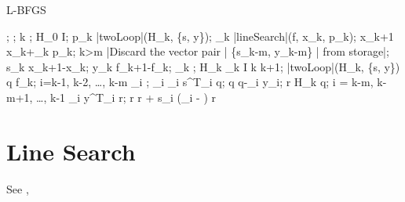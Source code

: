 \begin{algorithm}
    \mbox{L-BFGS}
    \begin{program}
        \BEGIN
        ;
        ;
        k ;
        H_0 \leftarrow I;
        \WHILE \NOT{} \DO
        p_k \leftarrow |twoLoop|(H_k, \{s, y\});
        \alpha_k \leftarrow |lineSearch|(f, x_k, p_k); 
        x_{k+1} \leftarrow x_k+\alpha_k p_k;
        \IF k>m
        \THEN
            |Discard the vector pair | \{s_{k-m}, y_{k-m}\} | from storage|;
        \FI
        s_k \leftarrow x_{k+1}-x_k;
        y_k \leftarrow \nabla f_{k+1}-\nabla f_k;
        \gamma_k \leftarrow {};
        H_k \leftarrow \gamma_k I
        k \leftarrow k+1;
        \OD
        \WHERE
        \FUNCT |twoLoop|(H_k, \{s, y\}) \BODY
            \EXP q \leftarrow \nabla f_k;
            \FOR i=k-1, k-2, \ldots, k-m \DO
            \rho_i \leftarrow {};
            \alpha_i \leftarrow \rho_i s^T_i q;
            q \leftarrow q-\alpha_i y_i;
            \OD
            r \leftarrow H_k q;
            \FOR i = k-m, k-m+1, \ldots, k-1 \DO
            \beta \leftarrow \rho_i y^T_i r;
            r \leftarrow r + s_i (\alpha_i - \beta)
            \OD
            r \ENDEXP \ENDFUNCT
        \END
    \end{program}
\end{algorithm}

\section{Line Search}\label{sec:LineSearch}
See \cite{Nocedal2006}, \cite{MoreThuente1992}

